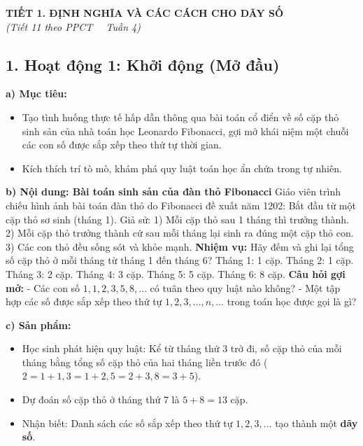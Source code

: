 \documentclass[12pt, a4paper]{article}
\begin{document}
\begin{center}  
    {\fontsize{13pt}{16pt}\selectfont \textbf{TIẾT 1. ĐỊNH NGHĨA VÀ CÁC CÁCH CHO DÃY SỐ}}\\[2pt]  
    \textit{(Tiết 11 theo PPCT \ \textbar \ Tuần 4)}  
\end{center}  
  
\subsection*{1. Hoạt động 1: Khởi động (Mở đầu)}  
  
\noindent \textbf{a) Mục tiêu:}  
\begin{itemize}[leftmargin=0.8cm]  
    \item Tạo tình huống thực tế hấp dẫn thông qua bài toán cổ điển về số cặp thỏ sinh sản của nhà toán học Leonardo Fibonacci, gợi mở khái niệm một chuỗi các con số được sắp xếp theo thứ tự thời gian.  
    \item Kích thích trí tò mò, khám phá quy luật toán học ẩn chứa trong tự nhiên.  
\end{itemize}  
  
\noindent \textbf{b) Nội dung: Bài toán sinh sản của đàn thỏ Fibonacci}  
Giáo viên trình chiếu hình ảnh bài toán đàn thỏ do Fibonacci đề xuất năm 1202:  
Bắt đầu từ một cặp thỏ sơ sinh (tháng 1). Giả sử:  
1) Mỗi cặp thỏ sau 1 tháng thì trưởng thành.  
2) Mỗi cặp thỏ trưởng thành cứ sau mỗi tháng lại sinh ra đúng một cặp thỏ con.  
3) Các con thỏ đều sống sót và khỏe mạnh.  
\textbf{Nhiệm vụ:} Hãy đếm và ghi lại tổng số cặp thỏ ở mỗi tháng từ tháng 1 đến tháng 6?  
Tháng 1: 1 cặp. \qquad Tháng 2: 1 cặp. \qquad Tháng 3: 2 cặp. \qquad Tháng 4: 3 cặp. \qquad Tháng 5: 5 cặp. \qquad Tháng 6: 8 cặp.  
\textbf{Câu hỏi gợi mở:}  
- Các con số $1, 1, 2, 3, 5, 8,\dots$ có tuân theo quy luật nào không?  
- Một tập hợp các số được sắp xếp theo thứ tự $1, 2, 3, \dots, n, \dots$ trong toán học được gọi là gì?  
  
\noindent \textbf{c) Sản phẩm:}  
\begin{itemize}[leftmargin=0.8cm]  
    \item Học sinh phát hiện quy luật: Kể từ tháng thứ 3 trở đi, số cặp thỏ của mỗi tháng bằng tổng số cặp thỏ của hai tháng liền trước đó ($2 = 1 + 1, 3 = 1 + 2, 5 = 2 + 3, 8 = 3 + 5$).  
    \item Dự đoán số cặp thỏ ở tháng thứ 7 là $5 + 8 = 13$ cặp.  
    \item Nhận biết: Danh sách các số sắp xếp theo thứ tự $1, 2, 3, \dots$ tạo thành một \textbf{dãy số}.  
\end{itemize}  
  
\end{document}
